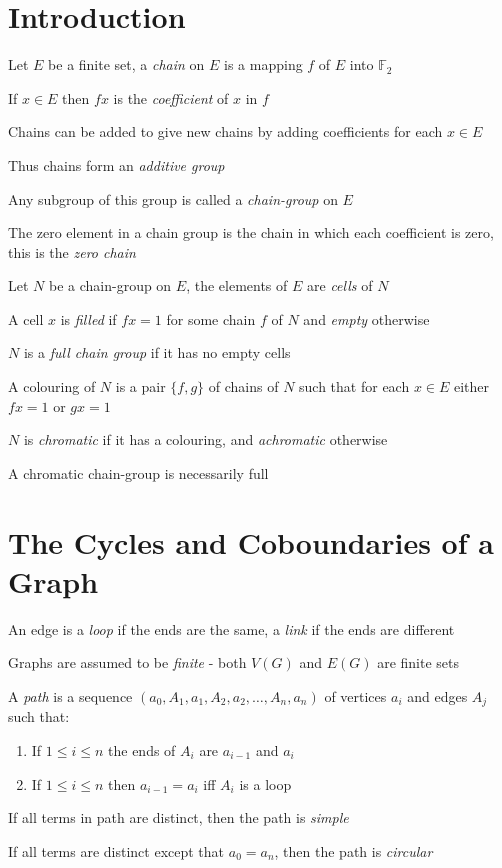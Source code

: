 \documentclass[a4paper]{article}
\begin{document}
\setlength{\parindent}{0pt}

\section{Introduction}

Let $E$ be a finite set, a \textit{chain} on $E$ is a mapping $f$ of $E$ into $\mathbb{F}_2$

If $x \in E$ then $fx$ is the \textit{coefficient} of $x$ in $f$

Chains can be added to give new chains by adding coefficients for each $x \in E$

Thus chains form an \textit{additive group}

Any subgroup of this group is called a \textit{chain-group} on $E$

The zero element in a chain group is the chain in which each coefficient is zero, this is the \textit{zero chain}

Let $N$ be a chain-group on $E$, the elements of $E$ are \textit{cells} of $N$

A cell $x$ is \textit{filled} if $fx = 1$ for some chain $f$ of $N$ and \textit{empty} otherwise

$N$ is a \textit{full chain group} if it has no empty cells

A colouring of $N$ is a pair $\{f,g\}$ of chains of $N$ such that for each $x \in E$ either $fx = 1$ or $gx = 1$

$N$ is \textit{chromatic} if it has a colouring, and \textit{achromatic} otherwise

A chromatic chain-group is necessarily full


\section{The Cycles and Coboundaries of a Graph}

An edge is a \textit{loop} if the ends are the same, a \textit{link} if the ends are different

Graphs are assumed to be \textit{finite} - both $V(G)$ and $E(G)$ are finite sets

A \textit{path} is a sequence $(a_0, A_1, a_1, A_2, a_2, \ldots, A_n, a_n)$ of vertices $a_i$ and edges $A_j$ such that:
\begin{enumerate}
\item If $1 \leq i \leq n$ the ends of $A_i$ are $a_{i-1}$ and $a_i$
\item If $1 \leq i \leq n$ then $a_{i-1} = a_i$ iff $A_i$ is a loop
\end{enumerate}

If all terms in path are distinct, then the path is \textit{simple}

If all terms are distinct except that $a_0 = a_n$, then the path is \textit{circular}
\end{document}
